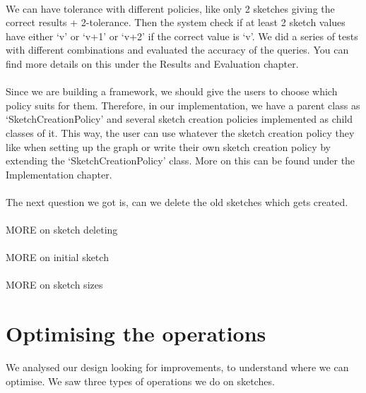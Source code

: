 \documentclass[12pt]{report}
\numberwithin{figure}{section}
\numberwithin{table}{section}
\begin{document}
\paragraph{}

We can have tolerance with different policies, like  only 2 sketches giving the correct results + 2-tolerance. Then the system check if at least 2 sketch values have either ‘v’ or ‘v+1’ or ‘v+2’ if the correct value is ‘v’. We did a series of tests with different combinations and evaluated the accuracy of the queries. You can find more details on this under the Results and Evaluation chapter.

\paragraph{}

Since we are building a framework, we should give the users to choose which policy suits for them. Therefore, in our implementation, we have a parent class as ‘SketchCreationPolicy’ and several sketch creation policies implemented as child classes of it. This way, the user can use whatever the sketch creation policy they like when setting up the graph or write their own sketch creation policy by extending the ‘SketchCreationPolicy’ class. More on this can be found under the Implementation chapter.

\paragraph{}

The next question we got is, can we delete the old sketches which gets created.  
\paragraph{}
MORE on sketch deleting
\paragraph{}
MORE on initial sketch
\paragraph{}
MORE on sketch sizes
\paragraph{}

\section{Optimising the operations}
We analysed our design looking for improvements, to understand where we can optimise. We saw three types of operations we do on sketches.
\end{document}
